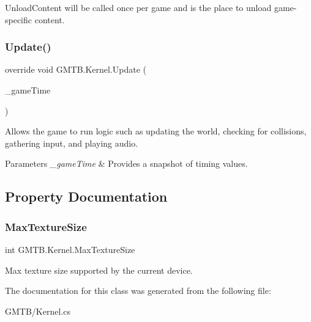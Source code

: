 Unload\+Content will be called once per game and is the place to unload game-\/specific content. 

\mbox{\label{class_g_m_t_b_1_1_kernel_a73b85a95594cb724d4a623ba61405e4d}} 
\subsubsection{\texorpdfstring{Update()}{Update()}}
{\footnotesize\ttfamily override void G\+M\+T\+B.\+Kernel.\+Update (\begin{DoxyParamCaption}\item[{Game\+Time}]{\+\_\+game\+Time }\end{DoxyParamCaption})\hspace{0.3cm}{\ttfamily [protected]}}



Allows the game to run logic such as updating the world, checking for collisions, gathering input, and playing audio. 


\begin{DoxyParams}{Parameters}
{\em \+\_\+game\+Time} & Provides a snapshot of timing values.\\
\hline
\end{DoxyParams}


\subsection{Property Documentation}
\mbox{\label{class_g_m_t_b_1_1_kernel_ad813862f6f7e2ba706af02b7b3b42da8}} 
\subsubsection{\texorpdfstring{MaxTextureSize}{MaxTextureSize}}
{\footnotesize\ttfamily int G\+M\+T\+B.\+Kernel.\+Max\+Texture\+Size\hspace{0.3cm}{\ttfamily [get]}}



Max texture size supported by the current device. 



The documentation for this class was generated from the following file\+:\begin{DoxyCompactItemize}
\item 
G\+M\+T\+B/Kernel.\+cs\end{DoxyCompactItemize}
